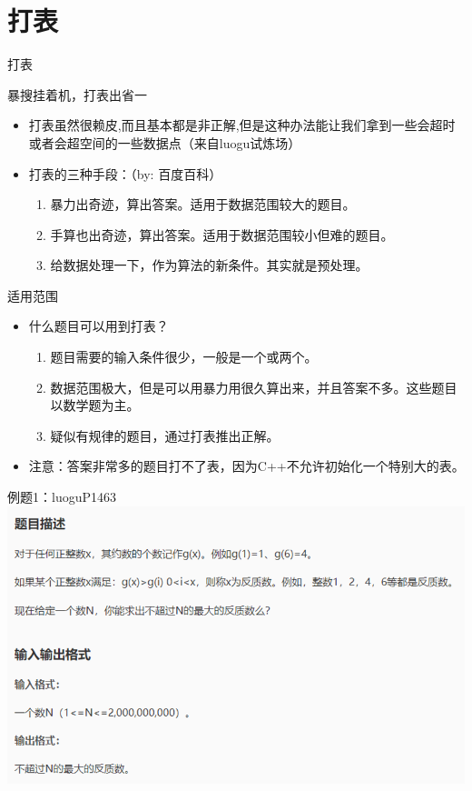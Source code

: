 \documentclass{beamer}[UTF-8]
\begin{document}
\section{打表} %
\begin{frame}{打表}
 \pause
\begin{center} 暴搜挂着机，打表出省一 \end{center}
 \pause
\begin{itemize}
\item 打表虽然很赖皮,而且基本都是非正解,但是这种办法能让我们拿到一些会超时或者会超空间的一些数据点（来自luogu试炼场） \pause
\item 打表的三种手段：（by: 百度百科） \pause
\begin{enumerate}
\item 暴力出奇迹，算出答案。适用于数据范围较大的题目。 \pause
\item 手算也出奇迹，算出答案。适用于数据范围较小但难的题目。 \pause
\item 给数据处理一下，作为算法的新条件。其实就是预处理。
\end{enumerate}
\end{itemize}

\end{frame}

\begin{frame}{适用范围}
 \pause
\begin{itemize}
\item 什么题目可以用到打表？ \pause
\begin{enumerate}
\item 题目需要的输入条件很少，一般是一个或两个。 \pause
\item 数据范围极大，但是可以用暴力用很久算出来，并且答案不多。这些题目以数学题为主。 \pause
\item 疑似有规律的题目，通过打表推出正解。 \pause
\end{enumerate}
\item 注意：答案非常多的题目打不了表，因为C++不允许初始化一个特别大的表。
\end{itemize}
\end{frame}

\begin{frame}{例题1：luoguP1463}
\includegraphics{luoguP1463.png}
\end{frame}
\end{document}
